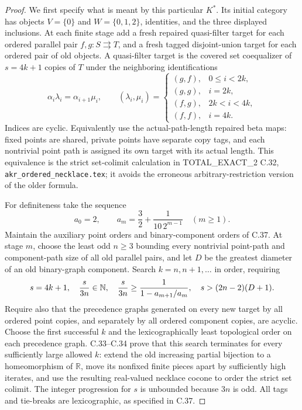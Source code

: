 \begin{proof}
We first specify what is meant by this particular $K^*$. Its initial category has objects $V=\{0\}$ and $W=\{0,1,2\}$, identities, and the three displayed inclusions. At each finite stage add a fresh repaired quasi-filter target for each ordered parallel pair $f,g:S\rightrightarrows T$, and a fresh tagged disjoint-union target for each ordered pair of old objects. A quasi-filter target is the covered set coequalizer of $s=4k+1$ copies of $T$ under the neighboring identifications
\[
 \alpha_i\lambda_i=\alpha_{i+1}\mu_i,
 \qquad
 (\lambda_i,\mu_i)=
 \begin{cases}
 (g,f),&0\leq i<2k,\\
 (g,g),&i=2k,\\
 (f,g),&2k<i<4k,\\
 (f,f),&i=4k.
 \end{cases}
\]
Indices are cyclic. Equivalently use the actual-path-length repaired beta maps: fixed points are shared, private points have separate copy tags, and each nontrivial point path is assigned its own target with its actual length. This equivalence is the strict set-colimit calculation in TOTAL\_EXACT\_2 C.32, \texttt{akr\_ordered\_necklace.tex}; it avoids the erroneous arbitrary-restriction version of the older formula.

For definiteness take the sequence
\[
 a_0=2,\qquad a_m=\frac32+\frac{1}{10\,2^{m-1}}\quad(m\geq1).
\]
Maintain the auxiliary point orders and binary-component orders of C.37. At stage $m$, choose the least odd $n\geq3$ bounding every nontrivial point-path and component-path size of all old parallel pairs, and let $D$ be the greatest diameter of an old binary-graph component. Search $k=n,n+1,\ldots$ in order, requiring
\[
 s=4k+1,\quad \frac{s}{3n}\in\mathbb N,\quad
 \frac{s}{3n}\geq\frac{1}{1-a_{m+1}/a_m},\quad
 s>(2n-2)(D+1).
\]
Require also that the precedence graphs generated on every new target by all ordered point copies, and separately by all ordered component copies, are acyclic. Choose the first successful $k$ and the lexicographically least topological order on each precedence graph. C.33--C.34 prove that this search terminates for every sufficiently large allowed $k$: extend the old increasing partial bijection to a homeomorphism of $\mathbb R$, move its nonfixed finite pieces apart by sufficiently high iterates, and use the resulting real-valued necklace cocone to order the strict set colimit. The integer progression for $s$ is unbounded because $3n$ is odd. All tags and tie-breaks are lexicographic, as specified in C.37.


\end{proof}
